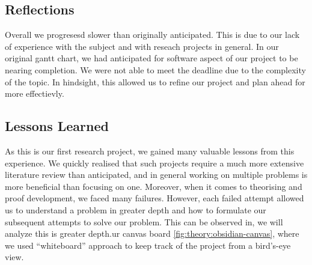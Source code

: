 \subsection{Reflections}

Overall we progresesd slower than originally anticipated. This 
is due to our lack of experience with the subject and with reseach projects in general.
In our original gantt chart, we had anticipated for software aspect of our project
to be nearing completion. We were not able to meet the deadline due to the complexity
of the topic. In hindsight, this allowed us to refine our project and plan ahead
for more effectievly. 

\subsection{Lessons Learned}

As this is our first research project, we gained many valuable lessons from this experience.
We quickly realised that such projects require a much more extensive literature review than anticipated, 
and in general working on multiple problems is more beneficial than focusing on one.
Moreover, when it comes to theorising and proof development, we faced many failures.
However, each failed attempt allowed us to understand a problem in greater depth and how to formulate our subsequent attempts to solve our problem.
This can be observed in, we will analyze this is greater depth.ur canvas board \ref{fig:theory:obsidian-canvas}, where we
used ``whiteboard'' approach to keep track of the project from a bird's-eye view. 


